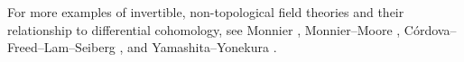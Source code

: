 For more examples of invertible, non-topological field theories and their relationship to differential cohomology,
see Monnier \cites[\S 4]{Mon15}[\S 5]{Mon17}{Mon18}, Monnier--Moore \cite{MM19},
Córdova--Freed--Lam--Seiberg \cite[\S\S 6.2 \& 7]{CFLS20a}, and
Yamashita--Yonekura \cite[\S\S 4.2, 6]{YY21}.
%
%
